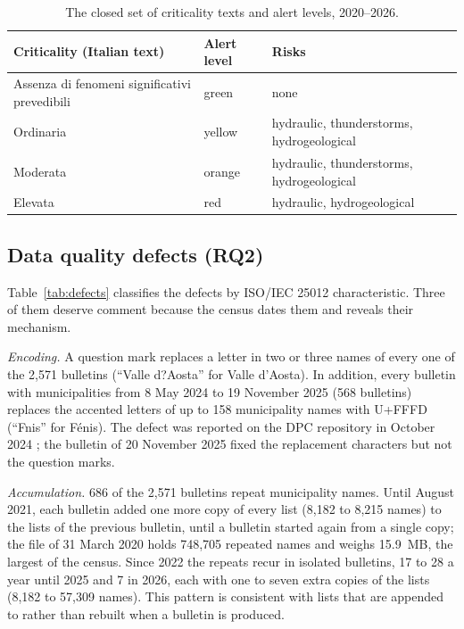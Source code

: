 \documentclass[review,authoryear,12pt]{elsarticle}
\newcommand{\replaced}{\fbox{\scriptsize ?}}
\begin{document}
\begin{table}[t]
\centering
\caption{The closed set of criticality texts and alert levels, 2020--2026.}
\label{tab:values}
\small
\begin{tabularx}{\linewidth}{@{}XlX@{}}
\toprule
Criticality (Italian text) & Alert level & Risks \\
\midrule
Assenza di fenomeni significativi prevedibili & green & none \\
Ordinaria & yellow & hydraulic, thunderstorms, hydrogeological \\
Moderata & orange & hydraulic, thunderstorms, hydrogeological \\
Elevata & red & hydraulic, hydrogeological \\
\bottomrule
\end{tabularx}
\end{table}

\subsection{Data quality defects (RQ2)}

Table~\ref{tab:defects} classifies the defects by ISO/IEC 25012
characteristic. Three of them deserve comment because the census dates them
and reveals their mechanism.

\emph{Encoding.} A question mark replaces a letter in two or three names of
every one of the 2,571 bulletins (``Valle d?Aosta'' for Valle d'Aosta). In
addition, every bulletin with municipalities from 8 May 2024 to 19 November
2025 (568 bulletins) replaces the accented letters of up to 158 municipality
names with U+FFFD (``F\replaced{}nis'' for Fénis). The defect was reported on
the DPC repository in October 2024 \citep{dpc2024issue10}; the bulletin of
20 November 2025 fixed the replacement characters but not the question marks.

\emph{Accumulation.} 686 of the 2,571 bulletins repeat municipality names.
Until August 2021, each bulletin added one more copy of every list (8,182 to
8,215 names) to the lists of the previous bulletin, until a bulletin started
again from a single copy; the file of 31 March 2020 holds 748,705 repeated
names and weighs 15.9~MB, the largest of the census. Since 2022 the repeats
recur in isolated bulletins, 17 to 28 a year until 2025 and 7 in 2026, each
with one to seven extra copies of the lists (8,182 to 57,309 names). This
pattern is consistent with lists that are appended to rather than rebuilt when
a bulletin is produced.
\end{document}
